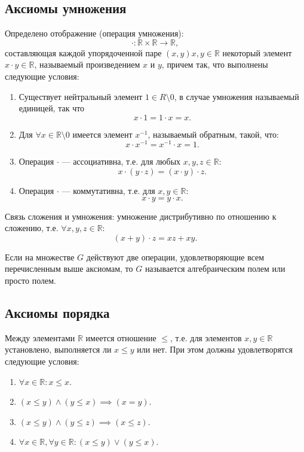 \documentclass[12pt]{report}
\theoremstyle{definition}
\newcommand{\R}{\mathbb R}
\begin{document}
\subsection{Аксиомы умножения}
Определено отображение (операция умножения):
$$
\cdot: \R \times \R \rightarrow \R,
$$
составляющая каждой упорядоченной паре $(x, y) x, y \in \R$
некоторый элемент $x \cdot y \in \R$, называемый произведением $x$ и $y$,
причем так, что выполнены следующие условия:

\begin{enumerate}
\item Существует нейтральный элемент $1 \in R \setminus 0$,
в случае умножения называемый единицей, так что
$$
x \cdot 1 = 1 \cdot x = x.
$$

\item Для $\forall x \in \R \setminus 0$ имеется элемент $x^{-1}$, называемый
обратным, такой, что:
$$
x \cdot x^{-1} = x^{-1} \cdot x = 1.
$$

\item Операция $\cdot$ --- ассоциативна, т.е. для любых $x, y, z \in \R$:
$$
x\cdot (y \cdot z) = (x \cdot y) \cdot z.
$$

\item Операция $\cdot$ --- коммутативна, т.е. для $x, y \in \R$:
$$
x \cdot y = y \cdot x.
$$

\end{enumerate}

Связь сложения и умножения: умножение дистрибутивно по отношению к сложению, т.е.
$\forall x, y, z \in \R$:
$$
(x + y) \cdot z = xz + xy.
$$

Если на множестве $G$ действуют две операции, удовлетворяющие всем перечисленным выше аксиомам,
то $G$ называется алгебраическим полем или просто полем.

\subsection{Аксиомы порядка}
Между элементами $\R$ имеется отношение $\le$, т.е. для элементов $x, y \in \R$ установлено,
выполняется ли $x \le y$ или нет. При этом должны удовлетворятся следующие условия:

\begin{enumerate}
\item $\forall x \in \R: x \le x$.
\item $(x \le y) \land (y \le x) \implies (x = y)$.
\item $(x \le y) \land (y \le z) \implies (x \le z)$.
\item $\forall x \in \R, \forall y \in \R: (x \le y) \lor (y \le x)$.
\end{enumerate}
\end{document}
